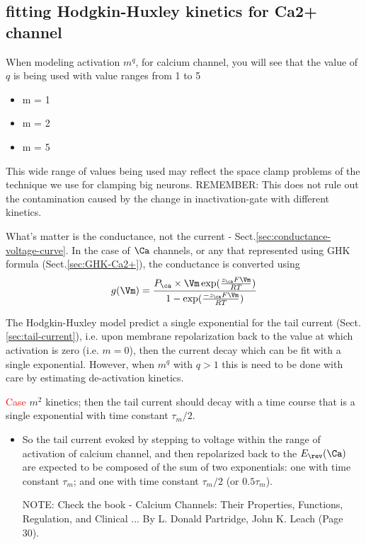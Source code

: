 \subsection{fitting Hodgkin-Huxley kinetics for Ca2+ channel}
\label{sec:fit-activation-Ca2+-channel}

When modeling activation $m^q$, for calcium channel, you will see that the value
of $q$ is being used with value ranges from 1 to 5
\begin{itemize}
  \item m = 1 
  \item m = 2
  \item m = 5 
\end{itemize}
This wide range of values being used may reflect the space clamp problems of
the technique we use for clamping big neurons. REMEMBER: This does not rule out
the contamination caused by the change in inactivation-gate with different
kinetics. 

What's matter is the conductance, not the current -
Sect.\ref{sec:conductance-voltage-curve}. In the case of $\Ca$ channels, or any
that represented using GHK formula (Sect.\ref{sec:GHK-Ca2+}), the conductance is
converted using
\begin{equation}
g(\Vm) = \frac{P_\ca \times \Vm \exp(\frac{z_\ca F\Vm}{RT})}{1 - \exp(
\frac{-z_\ca F\Vm}{RT})}
\end{equation}

The Hodgkin-Huxley model predict a single exponential for the tail current
(Sect.\ref{sec:tail-current}), i.e. upon membrane repolarization back to the
value at which activation is zero (i.e. $m=0$), then the current decay which
can be fit with a single exponential. However, when $m^q$ with $q>1$ this is
need to be done with care by estimating de-activation kinetics.

\textcolor{red}{Case} $m^2$ kinetics; then the tail current should decay with a
time course that is a single exponential with time constant $\tau_m/2$.
\begin{itemize}
  \item  So the tail current evoked by stepping to voltage within the range of
  activation of calcium channel, and then repolarized back to the $E_\rev(\Ca)$ are expected
to be composed of the sum of two exponentials: one with time constant $\tau_m$;
and one with time constant $\tau_m/2$ (or $0.5\tau_m$).

NOTE: Check the book - Calcium Channels: Their Properties, Functions,
Regulation, and Clinical ...
By L. Donald Partridge, John K. Leach (Page 30).


\end{itemize}

